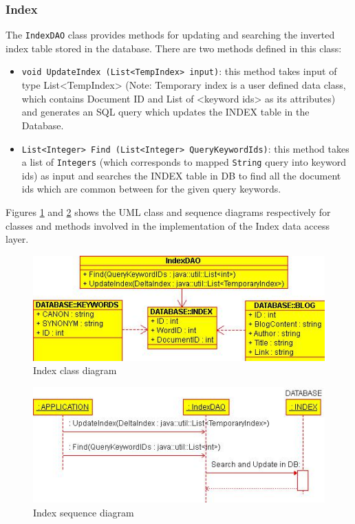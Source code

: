 \documentclass[10pt]{report}
\begin{document}
\subsubsection{Index}
The \texttt{IndexDAO} class provides methods for updating and
searching the inverted index table stored in the database. There are
two methods defined in this class: 

\begin{itemize}
\item \texttt{void UpdateIndex (List<TempIndex> input)}: this method
  takes input of type List<TempIndex> (Note: Temporary index is a user
  defined data class, which contains Document ID and List of <keyword
  ids> as its attributes) and generates an SQL query which updates the
  INDEX table in the Database. 

\item \texttt{List<Integer> Find (List<Integer> QueryKeywordIds)}:
  this method takes a list of \texttt{Integers} (which corresponds to
  mapped \texttt{String} query into keyword ids) as input and searches
  the INDEX table in DB to find all the document ids which are common
  between for the given query keywords. 
\end{itemize}

 Figures \ref{fig:indexclassdiagram} and
 \ref{fig:indexsequencediagram} shows the UML class and sequence
 diagrams respectively for classes and methods involved in the
 implementation of the Index data access layer.

\begin{figure}
  \begin{center}
	\includegraphics[width=\textwidth,height=!]{indexclassdiagram}
  \end{center}
  \caption{Index class diagram}
  \label{fig:indexclassdiagram}
\end{figure} 

\begin{figure}
  \begin{center}
	\includegraphics[width=\textwidth,height=!]{indexsequencediagram}
  \end{center}
  \caption{Index sequence diagram}
  \label{fig:indexsequencediagram}
\end{figure} 
\end{document}
